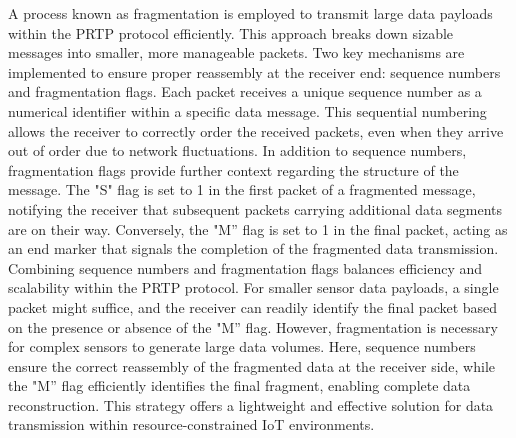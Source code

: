 \documentclass[lettersize,journal]{IEEEtran}
\begin{document}
A process known as fragmentation is employed to transmit large data payloads within the PRTP protocol efficiently. This approach breaks down sizable messages into smaller, more manageable packets. Two key mechanisms are implemented to ensure proper reassembly at the receiver end: sequence numbers and fragmentation flags. Each packet receives a unique sequence number as a numerical identifier within a specific data message. This sequential numbering allows the receiver to correctly order the received packets, even when they arrive out of order due to network fluctuations. In addition to sequence numbers, fragmentation flags provide further context regarding the structure of the message. The "S" flag is set to 1 in the first packet of a fragmented message, notifying the receiver that subsequent packets carrying additional data segments are on their way. Conversely, the "M'' flag is set to 1 in the final packet, acting as an end marker that signals the completion of the fragmented data transmission. Combining sequence numbers and fragmentation flags balances efficiency and scalability within the PRTP protocol. For smaller sensor data payloads, a single packet might suffice, and the receiver can readily identify the final packet based on the presence or absence of the "M'' flag. However, fragmentation is necessary for complex sensors to generate large data volumes. Here, sequence numbers ensure the correct reassembly of the fragmented data at the receiver side, while the "M'' flag efficiently identifies the final fragment, enabling complete data reconstruction. This strategy offers a lightweight and effective solution for data transmission within resource-constrained IoT environments.
\end{document}
